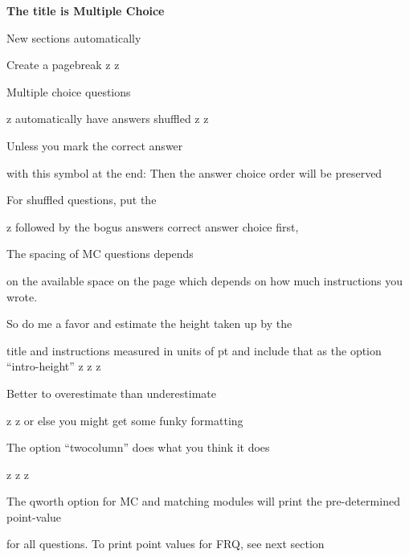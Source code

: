 \documentclass{exam}
\begin{document}
\newpage
\par\noindent \textbf{\large  The title is Multiple Choice}
\setlength{\columnsep}{0.40 in}
\begin{multicols*}{2}
\renewcommand{\choiceshook}{\setlength{\leftmargin}{0.40 in}}
\renewcommand{\questionshook}{\setlength{\leftmargin}{0.0 in}}
\begin{questions}
\setcounter{question}{18}
	\question[2] New sections automatically
	\begin{choices}
		\CorrectChoice Create a pagebreak
		\choice z
		\choice z
	\end{choices}
	\question[2] Multiple choice questions
	\begin{choices}
		\choice z
		\CorrectChoice automatically have answers shuffled
		\choice z
		\choice z
	\end{choices}
	\question[2] Unless you mark the correct answer
	\begin{choices}
		\CorrectChoice with this symbol at the end:
		\choice Then the answer choice order
		\choice will be
		\choice preserved
	\end{choices}
	\question[2] For shuffled questions, put the
	\begin{choices}
		\choice z
		\choice followed by the bogus answers
		\CorrectChoice correct answer choice first,
	\end{choices}
	\question[2] The spacing of MC questions depends
	\begin{choices}
		\choice on the available space on the page
		\CorrectChoice which depends on how much instructions you wrote.
	\end{choices}
	\question[2] So do me a favor and estimate the height taken up by the
	\begin{choices}
		\choice title and instructions
		\CorrectChoice measured in units of pt
		\choice and include that as the option ``intro-height''
		\choice z
		\choice z
		\choice z
	\end{choices}
	\question[2] Better to overestimate than underestimate
	\begin{choices}
		\choice z
		\choice z
		\CorrectChoice or else you might get some funky formatting
	\end{choices}
	\vfill\null\columnbreak
	\question[2] The option ``twocolumn'' does what you think it does
	\begin{choices}
		\CorrectChoice z
		\CorrectChoice z
		\CorrectChoice z
	\end{choices}
	\question[2] The qworth option for MC and matching modules will print the pre-determined point-value
	\begin{choices}
		\CorrectChoice for all questions.
		\choice To print point values for FRQ, see next section
	\end{choices}
\end{questions}
\end{multicols*}
\renewcommand{\choiceshook}{}
\renewcommand{\questionshook}{}
\end{document}
